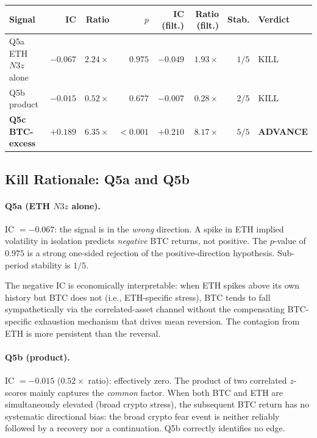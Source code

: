 \documentclass[12pt, a4paper]{article}
\theoremstyle{plain}
\theoremstyle{definition}
\begin{document}
\begin{center}
\begin{tabular}{lrrrrrrl}
\toprule
Signal & IC & Ratio & $p$ & IC (filt.) & Ratio (filt.) & Stab. & Verdict \\
\midrule
Q5a ETH $N3z$ alone  & $-0.067$ & $2.24\times$ & $0.975$ & $-0.049$ & $1.93\times$ & $1/5$ & KILL \\
Q5b product          & $-0.015$ & $0.52\times$ & $0.677$ & $-0.007$ & $0.28\times$ & $2/5$ & KILL \\
\textbf{Q5c BTC-excess} & $+0.189$ & $6.35\times$ & $<0.001$ & $+0.210$ & $8.17\times$ & $5/5$ & \textbf{ADVANCE} \\
\bottomrule
\end{tabular}
\end{center}

\subsection{Kill Rationale: Q5a and Q5b}

\paragraph{Q5a (ETH $N3z$ alone).}
IC $= -0.067$: the signal is in the \emph{wrong} direction.  A spike in
ETH implied volatility in isolation predicts \emph{negative} BTC returns,
not positive.  The $p$-value of $0.975$ is a strong one-sided rejection of
the positive-direction hypothesis.  Sub-period stability is $1/5$.

The negative IC is economically interpretable: when ETH spikes above its
own history but BTC does not (i.e., ETH-specific stress), BTC tends to
fall sympathetically via the correlated-asset channel without the compensating
BTC-specific exhaustion mechanism that drives mean reversion.  The
contagion from ETH is more persistent than the reversal.

\paragraph{Q5b (product).}
IC $= -0.015$ ($0.52\times$ ratio): effectively zero.  The product of two
correlated $z$-scores mainly captures the \emph{common} factor.  When both
BTC and ETH are simultaneously elevated (broad crypto stress), the
subsequent BTC return has no systematic directional bias: the broad
crypto fear event is neither reliably followed by a recovery nor a
continuation.  Q5b correctly identifies no edge.
\end{document}

